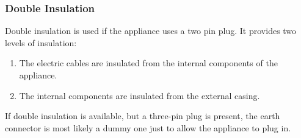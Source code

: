 \documentclass[../main.tex]{subfiles}
\begin{document}
	\subsubsection{Double Insulation}
	Double insulation is used if the appliance uses a two pin plug. It provides two levels of insulation:
	\begin{enumerate}
		\item The electric cables are insulated from the internal components of the appliance.
		\item The internal components are insulated from the external casing.
	\end{enumerate}
	If double insulation is available, but a three-pin plug is present, the earth connector is most likely a dummy one just to allow the appliance to plug in.
\end{document}
